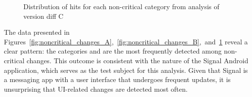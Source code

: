 \begin{figure}[H]
    \centering
    \resizebox{0.92\textwidth}{!}{%
        \begin{tikzpicture}
        \path[%
            dc sector/.append style={shift={(\MedA:5pt)}}, %
            dc dtag/.append style={},
            dc legend/.append style={text width=3.5cm, align=right},
            every pin/.style={fill=\Cj,draw=\Cj!50!black,thick},
            /DiagCirc/.cd,
            value list={
                18/Network call,
                159/UI update,
                178/Library function,
                14/Text manipulation
            },
            color list={"color6","color7","color8","color9"},
            angle max=180,             %
            angle corr={0,0,0,0,0,0},    %
            legend=\N\ :\hfill \V,     %
            factor=.9,
            percent corr={0,0,0,0,0,0}, %
            shift sector={0,0,0,0,0,0}, %
            tags={%
                \P                   %
            },
            sup loop={%
                \def\Pin{{10, 88, 120, 160}}
                \pgfmathparse{array(\Pin,\j)}
                \edef\Pinj{\pgfmathresult}
                \node[pin=\Pinj:\N] at (DC\j) {};
            },
            diagram] ;
        
        \end{tikzpicture}
    }
    \caption{Distribution of hits for each non-critical category from analysis of version diff C}
    \label{fig:noncritical_changes_C}
\end{figure}

The data presented in Figures~\ref{fig:noncritical_changes_A},~\ref{fig:noncritical_changes_B},~and~\ref{fig:noncritical_changes_C} reveal a clear pattern: the categories  and  are the most frequently detected among non-critical changes. This outcome is consistent with the nature of the Signal Android application, which serves as the test subject for this analysis. Given that Signal is a messaging app with a user interface that undergoes frequent updates, it is unsurprising that UI-related changes are detected most often. 

